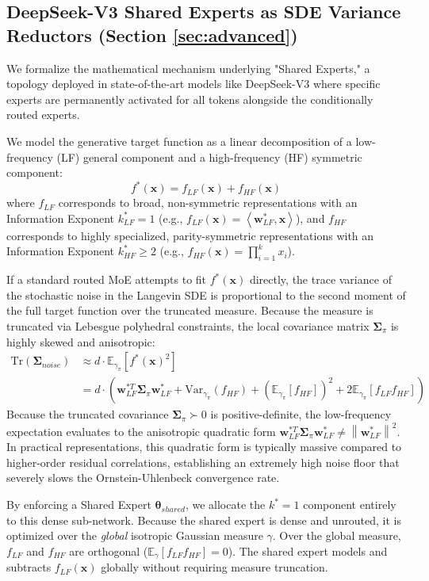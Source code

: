 \documentclass{article}
\newcommand{\E}{\mathbb{E}}
\newcommand{\1}{\mathbb{I}}
\newcommand{\norm}[1]{\left\lVert#1\right\rVert}
\newcommand{\inner}[2]{\left\langle#1, #2\right\rangle}
\newcommand{\bx}{\mathbf{x}}
\newcommand{\bw}{\mathbf{w}}
\newcommand{\btheta}{\boldsymbol{\theta}}
\newcommand{\bSigma}{\boldsymbol{\Sigma}}
\newcommand{\Tr}{\mathrm{Tr}}
\begin{document}
\subsection{DeepSeek-V3 Shared Experts as SDE Variance Reductors (Section \ref{sec:advanced})}
\label{app:shared_experts}

We formalize the mathematical mechanism underlying "Shared Experts," a topology deployed in state-of-the-art models like DeepSeek-V3 \citep{deepseek2024v3} where specific experts are permanently activated for all tokens alongside the conditionally routed experts.

We model the generative target function as a linear decomposition of a low-frequency (LF) general component and a high-frequency (HF) symmetric component:
\begin{equation}
    f^*(\bx) = f_{LF}(\bx) + f_{HF}(\bx)
\end{equation}
where $f_{LF}$ corresponds to broad, non-symmetric representations with an Information Exponent $k_{LF}^* = 1$ (e.g., $f_{LF}(\bx) = \inner{\bw_{LF}^*}{\bx}$), and $f_{HF}$ corresponds to highly specialized, parity-symmetric representations with an Information Exponent $k_{HF}^* \ge 2$ (e.g., $f_{HF}(\bx) = \prod_{i=1}^k x_i$).

If a standard routed MoE attempts to fit $f^*(\bx)$ directly, the trace variance of the stochastic noise in the Langevin SDE is proportional to the second moment of the full target function over the truncated measure. Because the measure is truncated via Lebesgue polyhedral constraints, the local covariance matrix $\bSigma_\pi$ is highly skewed and anisotropic:
\begin{align}
    \Tr(\bSigma_{noise}) &\approx d \cdot \E_{\gamma_\pi}[f^*(\bx)^2] \\ &= d \cdot \left( \bw_{LF}^{*T} \bSigma_\pi \bw_{LF}^* + \text{Var}_{\gamma_\pi}(f_{HF}) + (\E_{\gamma_\pi}[f_{HF}])^2 + 2\E_{\gamma_\pi}[f_{LF} f_{HF}] \right)
\end{align}
Because the truncated covariance $\bSigma_\pi \succ 0$ is positive-definite, the low-frequency expectation evaluates to the anisotropic quadratic form $\bw_{LF}^{*T} \bSigma_\pi \bw_{LF}^* \neq \norm{\bw_{LF}^*}^2$. In practical representations, this quadratic form is typically massive compared to higher-order residual correlations, establishing an extremely high noise floor that severely slows the Ornstein-Uhlenbeck convergence rate.

By enforcing a Shared Expert $\btheta_{shared}$, we allocate the $k^*=1$ component entirely to this dense sub-network. Because the shared expert is dense and unrouted, it is optimized over the \textit{global} isotropic Gaussian measure $\gamma$. Over the global measure, $f_{LF}$ and $f_{HF}$ are orthogonal ($\E_\gamma[f_{LF}f_{HF}]=0$). The shared expert models and subtracts $f_{LF}(\bx)$ globally without requiring measure truncation. 
\end{document}
